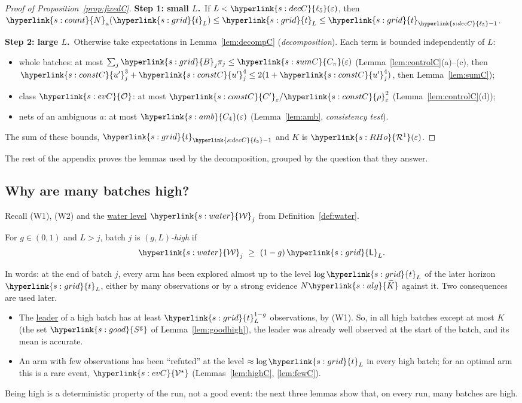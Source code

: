 \documentclass[10pt]{article}
\newcommand{\dt}[1]{\hypertarget{#1}{}}
\newcommand{\sy}[2]{{\hyperlink{#1}{#2}}}
\newcommand{\1}{\mathbf{1}}
\newcommand{\Ng}{\sy{s:count}{N}}
\newcommand{\tl}{\sy{s:grid}{t}}
\newcommand{\Lg}{\sy{s:grid}{\mathsf L}}
\newcommand{\Bg}{\sy{s:grid}{B}}
\newcommand{\Kt}{\sy{s:alg}{\widetilde K}}
\newcommand{\Cg}{\sy{s:constC}{C'}}
\newcommand{\rz}{\sy{s:constC}{\rho}}
\newcommand{\up}{\sy{s:constC}{u'}}
\newcommand{\Lam}{\sy{s:water}{\mathcal W}}
\newcommand{\Vs}{\sy{s:evC}{\mathcal V^\star}}
\newcommand{\cO}{\sy{s:evC}{\mathcal O}}
\newcommand{\Sgo}{\sy{s:good}{S^{\mathrm g}}}
\newcommand{\Cfour}{\sy{s:amb}{C_4}}
\newcommand{\Cpi}{\sy{s:sumC}{C_\pi}}
\newcommand{\RHo}{\sy{s:RHo}{\mathcal R^{1}}}
\newcommand{\lfive}{\sy{s:decC}{\ell_5}}
\newcommand{\stp}[2]{\par\medskip\noindent\textbf{Step #1: #2.}\ }
\newcommand{\term}[2]{\hyperlink{#1}{#2}}
\begin{document}
\begin{proof}[Proof of Proposition~\ref{prop:fixedC}]
\stp1{small $L$}If $L<\lfive(\varepsilon)$, then $\Ng_a(\tl_L)\le\tl_L\le\tl_{\lfive-1}$.

\stp2{large $L$}Otherwise take expectations in Lemma~\ref{lem:decompC} (\emph{decomposition}). Each term is bounded independently of $L$:
\begin{itemize}
\item whole batches: at most $\sum_j\Bg_j\pi_j\le\Cpi(\varepsilon)$ (Lemma~\ref{lem:controlC}(a)--(c), then $\up_j^3+\up_j^4\le2(1+\up_j^4)$, then Lemma~\ref{lem:sumC});
\item class $\cO$: at most $\Cg_\varepsilon/\rz_\varepsilon^2$ (Lemma~\ref{lem:controlC}(d));
\item nets of an ambiguous $a$: at most $\Cfour(\varepsilon)$ (Lemma~\ref{lem:amb}, \emph{consistency test}).
\end{itemize}
The sum of these bounds, $\tl_{\lfive-1}$ and $K$ is $\RHo(\varepsilon)$.
\end{proof}

\noindent The rest of the appendix proves the lemmas used by the decomposition, grouped by the question that they answer.

\subsection{Why are many batches high?}\label{sec:app-water}

Recall (W1), (W2) and the \term{s:water}{water level} $\Lam_j$ from Definition~\ref{def:water}.
\begin{definition}\label{def:high}\dt{t:high}
For $g\in(0,1)$ and $L>j$, batch $j$ is \emph{$(g,L)$-high} if
\[
\Lam_j\ \ge\ (1-g)\,\Lg_L .
\]
\end{definition}
\noindent In words: at the end of batch $j$, every arm has been explored almost up to the level $\log\tl_L$ of the later horizon $\tl_L$, either by many observations or by a strong
evidence $N\Kt$ against it. Two consequences are used later.
\begin{itemize}
\item The \term{t:leader}{leader} of a high batch has at least $\tl_L^{1-g}$ observations, by (W1). So, in all high batches except at most $K$ (the set $\Sgo$ of Lemma~\ref{lem:goodhigh}), the leader was already well observed
at the start of the batch, and its mean is accurate.
\item An arm with few observations has been ``refuted'' at the level $\approx\log\tl_L$ in every high batch; for an optimal arm this is a rare event, $\Vs$
(Lemmas~\ref{lem:highC}, \ref{lem:fewC}).
\end{itemize}
Being high is a deterministic property of the run, not a good event: the next three lemmas show that, on every run, many batches are high.
\end{document}
